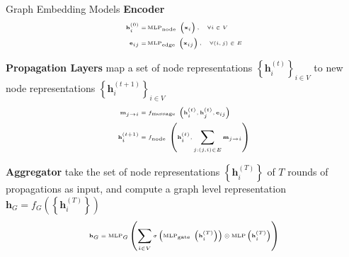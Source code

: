 \documentclass{beamer}
\begin{document}
\begin{frame}{Graph Embedding Models}
\textbf{Encoder}
\begin{equation*}
\begin{tiny}
\begin{aligned}
\mathbf{h}_{i}^{(0)}=& \operatorname{MLP}_{\text {node }}\left(\mathbf{x}_{i}\right), \quad \forall i \in V \\
\mathbf{e}_{i j}=& \operatorname{MLP}_{\text {edge }}\left(\mathbf{x}_{i j}\right), \quad \forall(i, j) \in E
\end{aligned}
\end{tiny}
\end{equation*}

\textbf{Propagation Layers}
map a set of node representations $\left\{\mathbf{h}_{i}^{(t)}\right\}_{i \in V}$ to new node representations $\left\{\mathbf{h}_{i}^{(t+1)}\right\}_{i \in V}$
\begin{equation*}
\begin{tiny}
\begin{aligned}
\mathbf{m}_{j \rightarrow i} &=f_{\text {message }}\left(\mathbf{h}_{i}^{(t)}, \mathbf{h}_{j}^{(t)}, \mathbf{e}_{i j}\right) \\
\mathbf{h}_{i}^{(t+1)} &=f_{\text {node }}\left(\mathbf{h}_{i}^{(t)}, \sum_{j:(j, i) \in E} \mathbf{m}_{j \rightarrow i}\right)
\end{aligned}
\end{tiny}
\end{equation*}

\textbf{Aggregator}
take the set of node representations $\left\{\mathbf{h}_{i}^{(T)}\right\}$ of $T$ rounds of propagations as input, and compute a graph level representation $\mathbf{h}_{G}=f_{G}\left(\left\{\mathbf{h}_{i}^{(T)}\right\}\right)$
\begin{equation*}
\begin{tiny}
\begin{aligned}
\mathbf{h}_{G}=\operatorname{MLP}_{G}\left(\sum_{i \in V} \sigma\left(\operatorname{MLP}_{\text {gate }}\left(\mathbf{h}_{i}^{(T)}\right)\right) \odot \operatorname{MLP}\left(\mathbf{h}_{i}^{(T)}\right)\right)
\end{aligned}
\end{tiny}
\end{equation*}
\end{frame}
\end{document}
